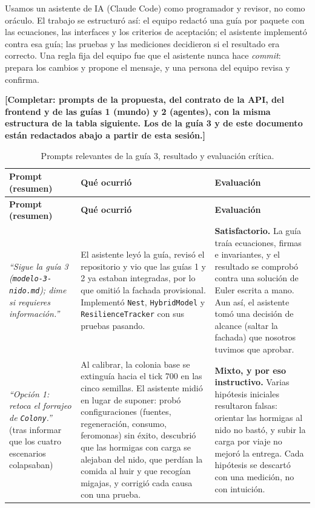 \documentclass[11pt,a4paper]{article}
\newcommand{\pendiente}[1]{\textcolor{pendiente}{\textbf{[#1]}}}
\newcommand{\code}[1]{\texttt{\small #1}}
\begin{document}
Usamos un asistente de IA (Claude Code) como programador y revisor, no como oráculo. El trabajo se estructuró así: el equipo redactó una guía por paquete con las ecuaciones, las interfaces y los criterios de aceptación; el asistente implementó contra esa guía; las pruebas y las mediciones decidieron si el resultado era correcto. Una regla fija del equipo fue que el asistente nunca hace \textit{commit}: prepara los cambios y propone el mensaje, y una persona del equipo revisa y confirma.

\pendiente{Completar: prompts de la propuesta, del contrato de la API, del frontend y de las guías 1 (mundo) y 2 (agentes), con la misma estructura de la tabla siguiente. Los de la guía 3 y de este documento están redactados abajo a partir de esta sesión.}

\small
\begin{xltabular}{\textwidth}{@{}p{3.2cm}XX@{}}
\caption{Prompts relevantes de la guía 3, resultado y evaluación crítica.}\label{tab:prompts}\\
\toprule \textbf{Prompt (resumen)} & \textbf{Qué ocurrió} & \textbf{Evaluación} \\ \midrule\endfirsthead
\toprule \textbf{Prompt (resumen)} & \textbf{Qué ocurrió} & \textbf{Evaluación} \\ \midrule\endhead
\textit{``Sigue la guía 3 (\code{modelo-3-nido.md}); dime si requieres información.''} &
El asistente leyó la guía, revisó el repositorio y vio que las guías 1 y 2 ya estaban integradas, por lo que omitió la fachada provisional. Implementó \code{Nest}, \code{HybridModel} y \code{ResilienceTracker} con sus pruebas pasando. &
\textbf{Satisfactorio.} La guía traía ecuaciones, firmas e invariantes, y el resultado se comprobó contra una solución de Euler escrita a mano. Aun así, el asistente tomó una decisión de alcance (saltar la fachada) que nosotros tuvimos que aprobar. \\
\addlinespace
\textit{``Opción 1: retoca el forrajeo de \code{Colony}.''} (tras informar que los cuatro escenarios colapsaban) &
Al calibrar, la colonia base se extinguía hacia el tick 700 en las cinco semillas. El asistente midió en lugar de suponer: probó configuraciones (fuentes, regeneración, consumo, feromonas) sin éxito, descubrió que las hormigas con carga se alejaban del nido, que perdían la comida al huir y que recogían migajas, y corrigió cada causa con una prueba. &
\textbf{Mixto, y por eso instructivo.} Varias hipótesis iniciales resultaron falsas: orientar las hormigas al nido no bastó, y subir la carga por viaje no mejoró la entrega. Cada hipótesis se descartó con una medición, no con intuición. \\

\end{xltabular}
\end{document}
